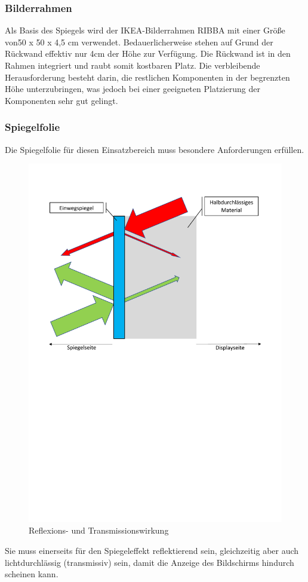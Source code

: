 \subsubsection*{Bilderrahmen}
Als Basis des Spiegels wird der IKEA-Bilderrahmen RIBBA mit einer Größe von50 x 50 x 4,5 cm verwendet. Bedauerlicherweise stehen auf Grund der Rückwand effektiv nur 4cm der Höhe zur Verfügung. Die Rückwand ist in den Rahmen integriert und raubt somit kostbaren Platz. Die verbleibende Herausforderung besteht darin, die restlichen Komponenten in der begrenzten Höhe unterzubringen, was jedoch bei einer geeigneten Platzierung der Komponenten sehr gut gelingt. 

\subsubsection*{Spiegelfolie}
Die Spiegelfolie für diesen Einsatzbereich muss besondere Anforderungen erfüllen. 
\begin{figure}
	\includegraphics[trim=10mm 140mm 30mm 80mm, scale=0.35]{bilder/Einwegspiegel.pdf}
	\caption{Reflexions- und Transmissionswirkung}
\end{figure}
Sie muss einerseits für den Spiegeleffekt reflektierend sein, gleichzeitig aber auch lichtdurchlässig (transmissiv) sein, damit die Anzeige des Bildschirms hindurch scheinen kann. 

